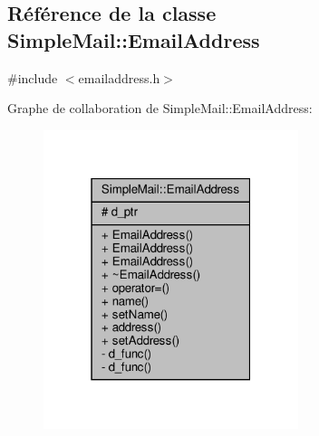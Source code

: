\hypertarget{class_simple_mail_1_1_email_address}{}\subsection{Référence de la classe Simple\+Mail\+:\+:Email\+Address}
\label{class_simple_mail_1_1_email_address}


{\ttfamily \#include $<$emailaddress.\+h$>$}



Graphe de collaboration de Simple\+Mail\+:\+:Email\+Address\+:\nopagebreak
\begin{figure}[H]
\begin{center}
\leavevmode
\includegraphics[width=211pt]{class_simple_mail_1_1_email_address__coll__graph}
\end{center}
\end{figure}
